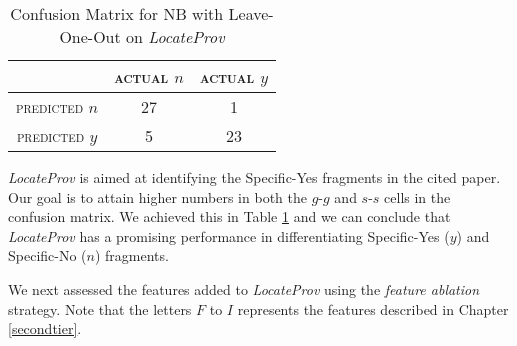 \begin{table}[h]
	\center
	\begin{tabular}{ c | c  c }
		 & \textsc{actual $n$} & \textsc{actual $y$} \\
		\hline
		\textsc{predicted $n$} 	& 27 & 1 \\
		\textsc{predicted $y$}		& 5 & 23
	\end{tabular}
	\caption{Confusion Matrix for NB with Leave-One-Out on {\it LocateProv}}
	\label{tab:secondnbconfusionmatrix}
\end{table}
{\it LocateProv} is aimed at identifying the Specific-Yes fragments in the cited paper. Our goal is to attain higher numbers in both the $g$-$g$ and $s$-$s$ cells in the confusion matrix. We achieved this in Table \ref{tab:secondnbconfusionmatrix} and we can conclude that {\it LocateProv} has a promising performance in differentiating Specific-Yes ($y$) and Specific-No ($n$) fragments.


We next assessed the features added to {\it LocateProv} using the {\it feature ablation} strategy. Note that the letters $F$ to $I$ represents the features described in Chapter \ref{secondtier}.

